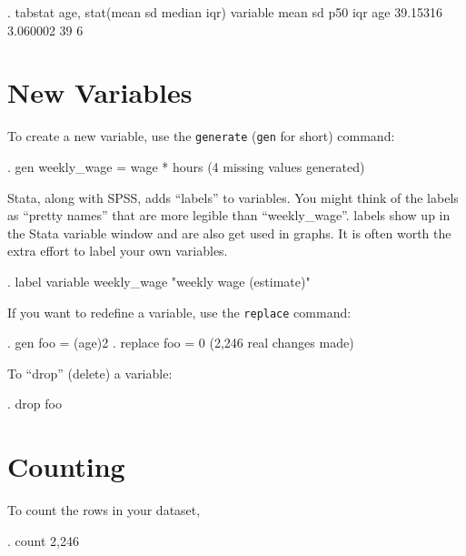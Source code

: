 \documentclass[]{article}
\begin{document}
\begin{stlog}
. tabstat age, stat(mean sd median iqr)
{\smallskip}
    variable {\VBAR}      mean        sd       p50       iqr
         age {\VBAR}  39.15316  3.060002        39         6
{\smallskip}
\end{stlog}

\section{New Variables}\label{new-variables}

To create a new variable, use the \texttt{generate} (\texttt{gen} for
short) command:

\begin{stlog}
. gen weekly_wage = wage * hours
(4 missing values generated)
{\smallskip}
\end{stlog}

Stata, along with SPSS, adds ``labels'' to variables. You might think of
the labels as ``pretty names'' that are more legible than
``weekly\_wage''. labels show up in the Stata variable window and are
also get used in graphs. It is often worth the extra effort to label
your own variables.

\begin{stlog}
. label variable weekly_wage "weekly wage (estimate)"
{\smallskip}
\end{stlog}

If you want to redefine a variable, use the \texttt{replace} command:

\begin{stlog}
. gen foo = (age){\caret}2
{\smallskip}
. replace foo = 0
(2,246 real changes made)
{\smallskip}
\end{stlog}

To ``drop'' (delete) a variable:

\begin{stlog}
. drop foo
{\smallskip}
\end{stlog}

\section{Counting}\label{counting}

To count the rows in your dataset,

\begin{stlog}
. count
  2,246
{\smallskip}
\end{stlog}
\end{document}

